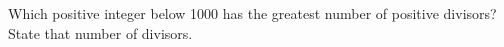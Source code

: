 Which positive integer below 1000 has the greatest number of positive divisors? State that number of divisors.
